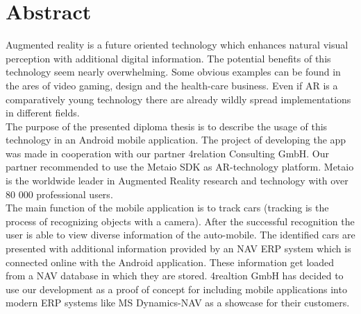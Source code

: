 \chapter*{Abstract}

Augmented reality is a future oriented technology which enhances natural visual perception with additional digital information. The potential benefits of this technology seem nearly overwhelming. Some obvious examples can be found in the ares of video gaming, design and the health-care business. Even if AR is a comparatively young technology there are already wildly spread implementations in different fields.          
\\

The purpose of the presented diploma thesis is to describe the usage of this technology in an Android mobile application. The project of developing the app was made in cooperation with our partner 4relation Consulting GmbH. Our partner recommended to use the Metaio SDK as AR-technology platform. Metaio is the worldwide leader in Augmented Reality research and technology with over 80 000 professional users.
\\

The main function of the mobile application is to track cars (tracking is the process of recognizing objects with a camera). After the successful recognition the user is able to view diverse information of the auto-mobile. The identified cars are presented with additional information provided by an NAV ERP system which is connected online with the Android application. These information get loaded from a NAV database in which they are stored. 4realtion GmbH has decided to use our development as a proof of concept for including mobile applications into modern ERP systems like MS Dynamics-NAV as a showcase for their customers. 